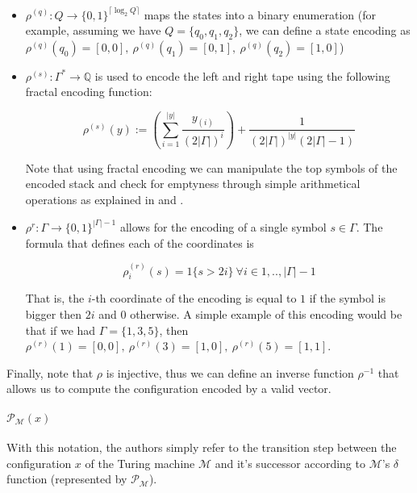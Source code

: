 \documentclass{article}
\begin{document}
\begin{itemize}
    \item $\rho^{(q)}: Q \rightarrow \{0,1\}^{\lceil \log_2 Q \rceil}$ maps the states into a binary enumeration (for example, assuming we have $Q=\{q_0,q_1,q_2\}$, we can define a state encoding as $\rho^{(q)}(q_0)=[0,0],\ \rho^{(q)}(q_1)=[0,1],\ \rho^{(q)}(q_2)=[1,0]$)
    \item $\rho^{(s)}: \Gamma^* \to \mathbb{Q}$ is used to encode the left and right tape using the following fractal encoding function:

        \begin{equation}\label{eq:fractal}
            \rho^{(s)}(y) := \left(\sum_{i=1}^{|y|} \frac{y_{(i)}}{{(2|\Gamma|)^i}}\right) + \frac{1}{(2|\Gamma|)^{|y|}(2|\Gamma|-1)}
        \end{equation}

    Note that using fractal encoding we can manipulate the top symbols of the encoded stack and check for emptyness through simple arithmetical operations as explained in \cite{SIE95} and \cite{SIE995}.
    \item $\rho^{r}:\Gamma \rightarrow \{0,1\}^{|\Gamma|-1}$ allows for the encoding of a single symbol $s \in \Gamma$. The formula that defines each of the coordinates is

        \begin{equation}
            \rho^{(r)}_i(s) = 1\{s > 2i\}\ \forall i \in {1,..,|\Gamma|-1}
        \end{equation}

    That is, the $i$-th coordinate of the encoding is equal to $1$ if the symbol is bigger then $2i$ and $0$ otherwise. A simple example of this encoding would be that if we had $\Gamma=\{1,3,5\}$, then $\rho^{(r)}(1)=[0,0],\ \rho^{(r)}(3)=[1,0],\ \rho^{(r)}(5)=[1,1]$.    
\end{itemize}

Finally, note that $\rho$ is injective, thus we can define an inverse function $\rho^{-1}$ that allows us to compute the configuration encoded by a valid vector.

\paragraph{$\mathcal{P}_{\mathcal{M}}(x)$} With this notation, the authors simply refer to the transition step between the configuration $x$ of the Turing machine $\mathcal{M}$ and it's successor according to $\mathcal{M}$'s $\delta$ function (represented by $\mathcal{P}_{\mathcal{M}}$).
\end{document}
